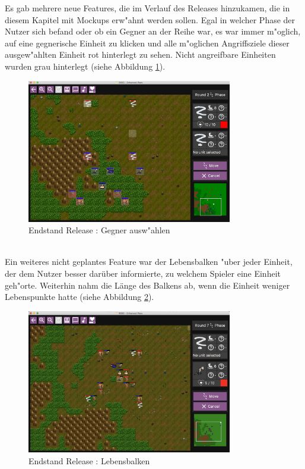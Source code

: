 \documentclass[12pt, titlepage]{scrartcl}
\newcommand{\RN}[1]{%
	\textup{\uppercase\expandafter{\romannumeral#1}}%
}
\newcounter{subsubsubsection}[subsubsection]
\begin{document}
					Es gab mehrere neue Features, die im Verlauf des Releases \RN{3} hinzukamen, die in diesem Kapitel mit Mockups erw"ahnt werden sollen.
					\vspace{0.3cm} \newline
					Egal in welcher Phase der Nutzer sich befand oder ob ein Gegner an der Reihe war, es war immer m"oglich, auf eine gegnerische Einheit zu klicken und alle m"oglichen Angriffsziele dieser ausgew"ahlten Einheit rot hinterlegt zu sehen. Nicht angreifbare Einheiten wurden grau hinterlegt (siehe Abbildung \ref{End_Select_Enemy}).
					\begin{figure}[H] 
						\centering
						\includegraphics[width=0.8\textwidth]{images/endOfRelease/SelectEnemy.png}
						\caption{Endstand Release \RN{3}: Gegner ausw"ahlen}
						\label{End_Select_Enemy}
					\end{figure}
					\ \\ Ein weiteres nicht geplantes Feature war der Lebensbalken "uber jeder Einheit, der dem Nutzer besser dar\"uber informierte, zu welchem Spieler eine Einheit geh"orte. Weiterhin nahm die L\"ange des Balkens ab, wenn die Einheit weniger Lebenspunkte hatte (siehe Abbildung \ref{End_Healthbar_Down}).
					\begin{figure}[H] 
						\centering
						\includegraphics[width=0.8\textwidth]{images/endOfRelease/HealthbarDown.png}
						\caption{Endstand Release \RN{3}: Lebensbalken}
						\label{End_Healthbar_Down}
					\end{figure}
\end{document}
